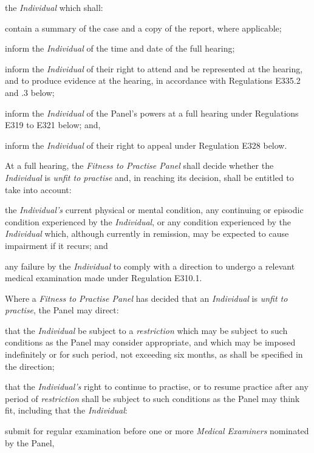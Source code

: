 the \emph{Individual} which shall:\\\nl \item contain a summary of the case and a copy of the report, where
applicable;\item inform the \emph{Individual} of the time and date of the full
hearing;\item inform the \emph{Individual} of their right to attend and be
represented at the hearing, and to produce evidence at the hearing, in
accordance with Regulations E335.2 and .3 below;\item inform the \emph{Individual} of the Panel's powers at a full hearing
under Regulations E319 to E321 below; and,\item inform the \emph{Individual} of their right to appeal under
Regulation E328 below.\ln
{}\par
{}
At a full hearing, the \emph{Fitness to Practise Panel} shall decide
whether the \emph{Individual} is \emph{unfit to practise} and, in
reaching its decision, shall be entitled to take into account:\\\nl \item the \emph{Individual's} current physical or mental condition, any
continuing or episodic condition experienced by the \emph{Individual},
or any condition experienced by the \emph{Individual} which, although
currently in remission, may be expected to cause impairment if it
recurs; and\item any failure by the \emph{Individual} to comply with a direction to
undergo a relevant medical examination made under Regulation E310.1.\ln
{}\par
Where a \emph{Fitness to Practise Panel} has decided that
an \emph{Individual} is \emph{unfit to practise}, the Panel may
direct:\\\nl \item that the \emph{Individual} be subject to a \emph{restriction} which
may be subject to such conditions as the Panel may consider appropriate,
and which may be imposed indefinitely or for such period, not exceeding
six months, as shall be specified in the direction;\item that the \emph{Individual's} right to continue to practise, or to
resume practice after any period of \emph{restriction} shall be subject
to such conditions as the Panel may think fit, including that
the \emph{Individual}:\al
\item  submit for regular examination before one or more \emph{Medical
Examiners} nominated by the Panel,\\
